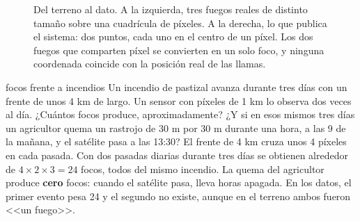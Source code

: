 \begin{figure}[ht]
\centering
{}
\caption{Del terreno al dato. A la izquierda, tres fuegos reales de distinto tamaño sobre una
cuadrícula de píxeles. A la derecha, lo que publica el sistema: dos puntos, cada uno en el
centro de un píxel. Los dos fuegos que comparten píxel se convierten en un solo foco, y
ninguna coordenada coincide con la posición real de las llamas.}
\label{fig:foco-pixel}
\end{figure}

\begin{ejemplo}{focos frente a incendios}
Un incendio de pastizal avanza durante tres días con un frente de unos 4 km de largo. Un sensor
con píxeles de 1 km lo observa dos veces al día. ¿Cuántos focos produce, aproximadamente?
¿Y si en esos mismos tres días un agricultor quema un rastrojo de 30 m por 30 m durante una
hora, a las 9 de la mañana, y el satélite pasa a las 13:30?
\solucion El frente de 4 km cruza unos 4 píxeles en cada pasada. Con dos pasadas diarias
durante tres días se obtienen alrededor de $4 \times 2 \times 3 = 24$ focos, todos del mismo
incendio. La quema del agricultor produce \textbf{cero} focos: cuando el satélite pasa, lleva
horas apagada. En los datos, el primer evento pesa 24 y el segundo no existe, aunque en el
terreno ambos fueron <<un fuego>>.
\end{ejemplo}

